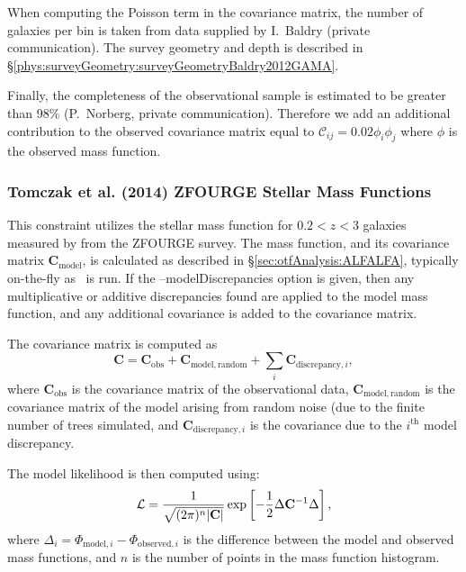When computing the Poisson term in the covariance matrix, the number of galaxies per bin is taken from data supplied by I.~Baldry (private communication). The survey geometry and depth is described in \S\ref{phys:surveyGeometry:surveyGeometryBaldry2012GAMA}.

Finally, the completeness of the observational sample is estimated to be greater than 98\% (P.~Norberg, private communication). Therefore we add an additional contribution to the observed covariance matrix equal to $\mathcal{C}_{ij} = 0.02 \phi_i \phi_j$ where $\phi$ is the observed mass function.

\subsubsection{Tomczak et al. (2014) ZFOURGE Stellar Mass Functions}\label{sec:AnalysisTomczakZFOURGEStellarMassFunction}

This constraint utilizes the stellar mass function for $0.2 < z< 3$ galaxies measured by \cite{tomczak_galaxy_2014} from the ZFOURGE survey. The mass function, and its covariance matrix $\mathbf{C}_\mathrm{model}$, is calculated as described in \S\ref{sec:otfAnalysis:ALFALFA}, typically on-the-fly as \glc\ is run. If the {\normalfont \ttfamily --modelDiscrepancies} option is given, then any multiplicative or additive discrepancies found are applied to the model mass function, and any additional covariance is added to the covariance matrix.

The covariance matrix is computed as
\begin{equation}
 \mathbf{C} = \mathbf{C}_\mathrm{obs} + \mathbf{C}_\mathrm{model,random} + \sum_i \mathbf{C}_{\mathrm{discrepancy}, i},
\end{equation}
where $\mathbf{C}_\mathrm{obs}$ is the covariance matrix of the observational data, $\mathbf{C}_\mathrm{model,random}$ is the covariance matrix of the model arising from random noise (due to the finite number of trees simulated, and $\mathbf{C}_{\mathrm{discrepancy}, i}$ is the covariance due to the $i^\mathrm{th}$ model discrepancy.

The model likelihood is then computed using:
\begin{equation}
 \mathcal{L} = {1 \over \sqrt{(2 \pi)^n |\mathbf{C}|}} \exp\left[ -{1\over 2} \Delta \mathbf{C}^{-1} \Delta \right],
\end{equation}
where $\Delta_i = \Phi_{\mathrm{model}, i} - \Phi_{\mathrm{observed}, i}$ is the difference between the model and observed mass functions, and $n$ is the number of points in the mass function histogram.

